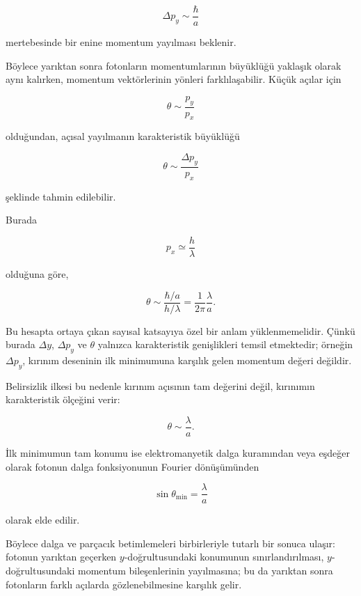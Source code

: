 \documentclass[00_kitap.tex]{subfiles}
\begin{document}
\begin{equation}
	\Delta p_y
	\sim
	\frac{\hbar}{a}
\end{equation}

mertebesinde bir enine momentum yayılması beklenir.

Böylece yarıktan sonra fotonların momentumlarının büyüklüğü yaklaşık
olarak aynı kalırken, momentum vektörlerinin yönleri farklılaşabilir.
Küçük açılar için

\begin{equation}
	\theta
	\sim
	\frac{p_y}{p_x}
\end{equation}

olduğundan, açısal yayılmanın karakteristik büyüklüğü

\begin{equation}
	\theta
	\sim
	\frac{\Delta p_y}{p_x}
\end{equation}

şeklinde tahmin edilebilir.

Burada

\begin{equation}
	p_x\simeq \frac{h}{\lambda}
\end{equation}

olduğuna göre,

\begin{equation}
	\theta
	\sim
	\frac{\hbar/a}{h/\lambda}
	=
	\frac{1}{2\pi}\frac{\lambda}{a}.
\end{equation}

Bu hesapta ortaya çıkan sayısal katsayıya özel bir anlam
yüklenmemelidir. Çünkü burada \(\Delta y\), \(\Delta p_y\) ve
\(\theta\) yalnızca karakteristik genişlikleri temsil etmektedir;
örneğin \(\Delta p_y\), kırınım deseninin ilk minimumuna karşılık gelen
momentum değeri değildir.

Belirsizlik ilkesi bu nedenle kırınım açısının tam değerini değil,
kırınımın karakteristik ölçeğini verir:

\begin{equation}
	\boxed{
		\theta \sim \frac{\lambda}{a}
	}.
\end{equation}

İlk minimumun tam konumu ise elektromanyetik dalga kuramından veya
eşdeğer olarak fotonun dalga fonksiyonunun Fourier dönüşümünden

\begin{equation}
	\boxed{
		\sin\theta_{\min}=\frac{\lambda}{a}
	}
\end{equation}

olarak elde edilir.

Böylece dalga ve parçacık betimlemeleri birbirleriyle tutarlı bir
sonuca ulaşır: fotonun yarıktan geçerken \(y\)-doğrultusundaki
konumunun sınırlandırılması, \(y\)-doğrultusundaki momentum
bileşenlerinin yayılmasına; bu da yarıktan sonra fotonların farklı
açılarda gözlenebilmesine karşılık gelir.










\BolumKaynakcaBitir
\end{document}
